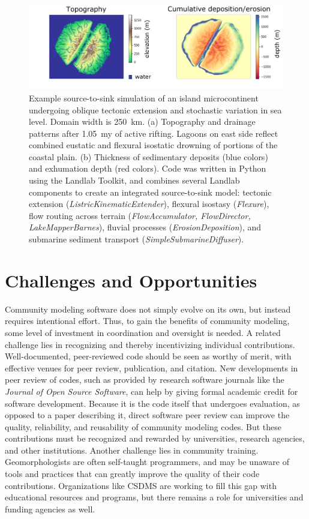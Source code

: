 \documentclass[10pt,twocolumn,preprint]{elsarticle}
\begin{document}
\begin{figure}[htbp]
   \centering
   \includegraphics[width=\textwidth]{figures/island_example210322.pdf} 
   \caption{Example source-to-sink simulation of an island microcontinent undergoing oblique tectonic extension and stochastic variation in sea level. Domain width is 250~km. (a) Topography and drainage patterns after 1.05~my of active rifting. Lagoons on east side reflect combined eustatic and flexural isostatic drowning of portions of the coastal plain. (b) Thickness of sedimentary deposits (blue colors) and exhumation depth (red colors). Code was written in Python using the Landlab Toolkit, and combines several Landlab components to create an integrated source-to-sink model: tectonic extension (\textit{ListricKinematicExtender}), flexural isostasy (\textit{Flexure}), flow routing across terrain (\textit{FlowAccumulator, FlowDirector, LakeMapperBarnes}), fluvial processes (\textit{ErosionDeposition}), and submarine sediment transport (\textit{SimpleSubmarineDiffuser}).}
   \label{fig:islandexample}
\end{figure}







\section{Challenges and Opportunities}

Community modeling software does not simply evolve on its own, but instead requires intentional effort. Thus, to gain the benefits of community modeling, some level of investment in coordination and oversight is needed. A related challenge lies in recognizing and thereby incentivizing individual contributions. Well-documented, peer-reviewed code should be seen as worthy of merit, with effective venues for peer review, publication, and citation. New developments in peer review of codes, such as provided by research software journals like the \textit{Journal of Open Source Software}, can help by giving formal academic credit for software development. Because it is the code itself that undergoes evaluation, as opposed to a paper describing it, direct software peer review can improve the quality, reliability, and reusability of community modeling codes. But these contributions must be recognized and rewarded by universities, research agencies, and other institutions. Another challenge lies in community training. Geomorphologists are often self-taught programmers, and may be unaware of tools and practices that can greatly improve the quality of their code contributions. Organizations like CSDMS are working to fill this gap with educational resources and programs, but there remains a role for universities and funding agencies as well.
\end{document}
